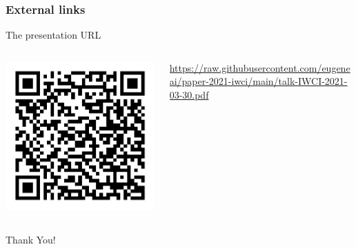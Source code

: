 \documentclass[10pt]{beamer}
\begin{document}
\begin{frame}
  \frametitle{External links}
  The presentation URL
  \begin{columns}
    \begin{column}{0.3\textwidth}
      \includegraphics[width=1\linewidth]{talk.pdf}
    \end{column}
    \begin{column}{0.7\textwidth}
      \url{https://raw.githubusercontent.com/eugeneai/paper-2021-iwci/main/talk-IWCI-2021-03-30.pdf}
    \end{column}
  \end{columns}
  \vspace{3em}
  \begin{center}
  \Large Thank You!
\end{center}
\end{frame}

\maketitle
\end{document}

